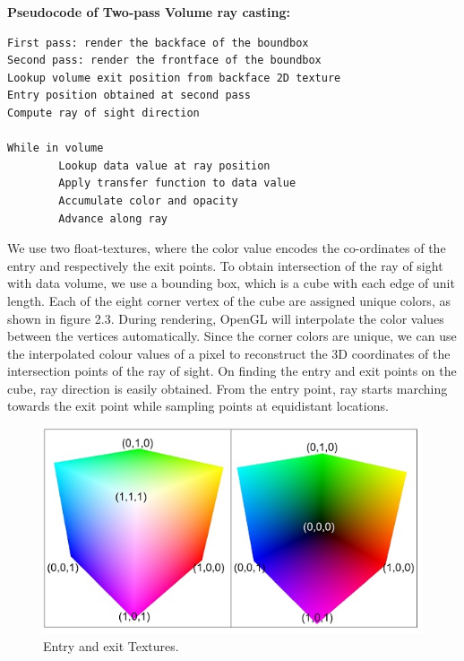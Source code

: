 

\lstset{style=customc}

\textbf{Pseudocode of Two-pass Volume ray casting:} 
\\
\begin{lstlisting}
First pass: render the backface of the boundbox  
Second pass: render the frontface of the boundbox
Lookup volume exit position from backface 2D texture 
Entry position obtained at second pass    
Compute ray of sight direction  

While in volume  
        Lookup data value at ray position  
        Apply transfer function to data value  
        Accumulate color and opacity  
        Advance along ray  
\end{lstlisting}	

We use two float-textures, where the color value encodes the co-ordinates of the entry and respectively the exit points. To obtain intersection of the ray of sight with data volume, we use a bounding box, which is a cube with each edge of unit length. Each of the eight corner vertex of the cube are assigned unique colors, as shown in figure 2.3. During rendering,  OpenGL will interpolate the color values between the vertices automatically. Since the corner colors are unique, we can use the interpolated colour values of a pixel to reconstruct the 3D coordinates of the intersection points of the ray of sight. On finding the entry and exit points on the cube, ray direction is easily obtained. From the entry point, ray starts marching towards the exit point while sampling points at equidistant locations.

\begin{figure}[!h]
\centering
\includegraphics[width=350pt]{Images/ray_entry_exit.jpg}
\caption{\label{fig:ray_cast1.jpg} Entry and exit Textures.}
\end{figure}


